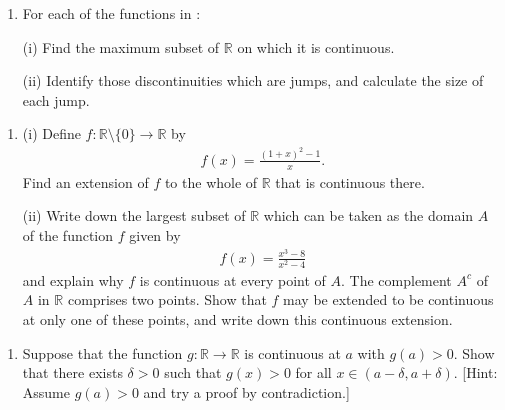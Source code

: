 \documentclass[letterpaper,10pt,english]{jupyterBook}
\begin{document}
\label{\detokenize{Problems:id17}}\begin{enumerate}
%
\setcounter{enumi}{16}
\item {} 
\sphinxAtStartPar
For each of the functions in {\hyperref[\detokenize{Problems:id7}]{}}:

\sphinxAtStartPar
(i) Find the maximum subset of \(\mathbb{R}\) on which it is continuous.

\sphinxAtStartPar
(ii) Identify those discontinuities which are jumps, and calculate the size of each jump.

\end{enumerate}
\label{\detokenize{Problems:id18}}\begin{enumerate}
%
\setcounter{enumi}{17}
\item {} 
\sphinxAtStartPar
(i) Define \(f:\mathbb{R} \setminus \{0\} \rightarrow \mathbb{R}\) by
\begin{equation*}
\begin{split}
    f(x) = \displaystyle\frac{(1 + x)^{2} - 1}{x}.
    \end{split}
\end{equation*}
\sphinxAtStartPar
Find an extension of \(f\) to the whole of \(\mathbb{R}\) that is continuous there.

\sphinxAtStartPar
(ii) Write down the largest subset of \(\mathbb{R}\) which can be taken as the domain \(A\) of the function \(f\) given by
\begin{equation*}
\begin{split}
    f(x) = \displaystyle\frac{x^{3}-8}{x^{2} - 4}
    \end{split}
\end{equation*}
\sphinxAtStartPar
and explain why \(f\) is continuous at every point of \(A\). The complement \(A^{c}\) of \(A\) in \(\mathbb{R}\) comprises two points. Show that \(f\) may be extended to be continuous at only one of these points, and write down this continuous extension.

\end{enumerate}
\label{\detokenize{Problems:id19}}\begin{enumerate}
%
\setcounter{enumi}{18}
\item {} 
\sphinxAtStartPar
{} Suppose that the function \(g: \mathbb{R} \rightarrow \mathbb{R}\) is continuous at \(a\) with \(g(a) > 0\). Show that there exists \(\delta > 0\) such that \(g(x) > 0\)  for all \( x \in (a - \delta, a + \delta)\). {[}Hint: Assume \(g(a) > 0\) and try a proof by contradiction.{]}

\end{enumerate}
\end{document}
